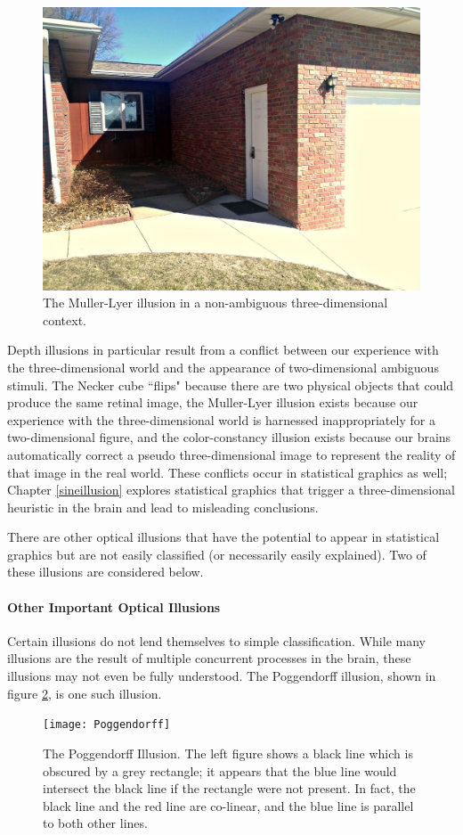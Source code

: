 \documentclass[11pt]{isuthesis}\usepackage[]{graphicx}\usepackage[]{color}
\begin{document}
\begin{figure}[htbp]\centering
\includegraphics[width=.5\linewidth]{mullerlyerhouse}
\caption[Muller Lyer real world context]{The Muller-Lyer illusion in a non-ambiguous three-dimensional context.}\label{fig:mullerlyerhouse}
\end{figure}

Depth illusions in particular result from a conflict between our experience with the three-dimensional world and the appearance of two-dimensional ambiguous stimuli. The Necker cube ``flips" because there are two physical objects that could produce the same retinal image, the Muller-Lyer illusion exists because our experience with the three-dimensional world is harnessed inappropriately for a two-dimensional figure, and the color-constancy illusion exists because our brains automatically correct a pseudo three-dimensional image to represent the reality of that image in the real world. These conflicts occur in statistical graphics as well; Chapter \ref{sineillusion} explores statistical graphics that trigger a three-dimensional heuristic in the brain and lead to misleading conclusions.

There are other optical illusions that have the potential to appear in statistical graphics but are not easily classified (or necessarily easily explained). Two of these illusions are considered below.
\paragraph{Other Important Optical Illusions}
Certain illusions do not lend themselves to simple classification. While many illusions are the result of multiple concurrent processes in the brain, these illusions may not even be fully understood. The Poggendorff illusion, shown in figure \ref{fig:poggendorff}, is one such illusion. 

\begin{figure}[htbp]\centering
\texttt{[image: Poggendorff]}
\caption[Poggendorff illusion]{The Poggendorff Illusion. The left figure shows a black line which is obscured by a grey rectangle; it appears that the blue line would intersect the black line if the rectangle were not present. In fact, the black line and the red line are co-linear, and the blue line is parallel to both other lines.}\label{fig:poggendorff}
\end{figure}
\end{document}
